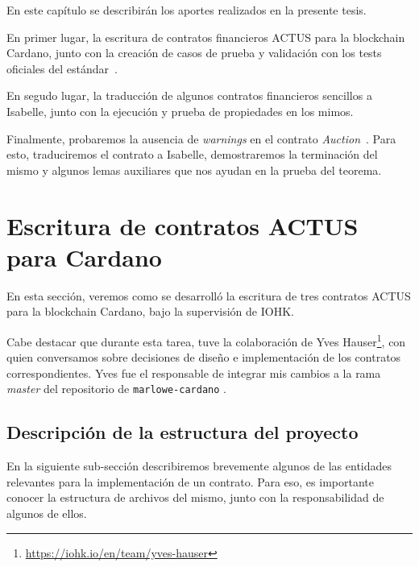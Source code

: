 \documentclass[12pt]{book}
\begin{document}
En este capítulo se describirán los aportes realizados en la presente tesis. 

En primer lugar, la escritura de contratos financieros ACTUS para la blockchain Cardano, junto con la creación de casos de prueba y validación con los tests oficiales del estándar~\cite{ACTUS_Tests}.

En segudo lugar, la traducción de algunos contratos financieros sencillos a Isabelle, junto con la ejecución y prueba de propiedades en los mimos.

Finalmente, probaremos la ausencia de \textit{warnings} en el contrato \textit{Auction}~\cite{auction_haskell}. Para esto, traduciremos el contrato a Isabelle, demostraremos la terminación del mismo y algunos lemas auxiliares que nos ayudan en la prueba del teorema.

\section{Escritura de contratos ACTUS para Cardano}

En esta sección, veremos como se desarrolló la escritura de tres contratos ACTUS para la blockchain Cardano, bajo la supervisión de IOHK.\@

Cabe destacar que durante esta tarea, tuve la colaboración de Yves Hauser\footnote{\url{https://iohk.io/en/team/yves-hauser}}, con quien conversamos sobre decisiones de diseño e implementación de los contratos correspondientes. Yves fue el responsable de integrar mis cambios a la rama \textit{master} del repositorio de \texttt{marlowe-cardano} \cite{marlowe-cardano-github}. %

\newpage
\subsection{Descripción de la estructura del proyecto}\label{ssec:estructura}

En la siguiente sub-sección describiremos brevemente algunos de las entidades relevantes para la implementación de un contrato. Para eso, es importante conocer la estructura de archivos del mismo, junto con la responsabilidad de algunos de ellos.
\end{document}
